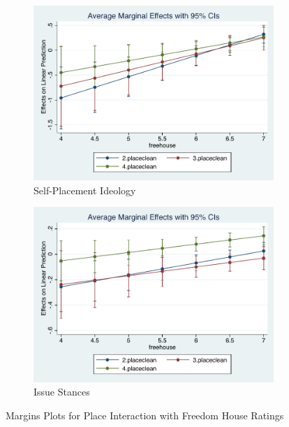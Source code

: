 \documentclass[12pt, titlepage]{article}
\begin{document}
\begin{figure}[H]
	\centering
	\begin{subfigure}[b]{0.475\textwidth}   
		\centering 
		\includegraphics[width=\textwidth]{Margins/IdeoPlaceFree}
		\caption{Self-Placement Ideology}
	\end{subfigure}
	\hfill
	\begin{subfigure}[b]{0.475\textwidth}
		\centering 
		\includegraphics[width=\textwidth]{Margins/LibPlaceFree}
		\caption{Issue Stances}
	\end{subfigure}
	\caption{Margins Plots for Place Interaction with Freedom House Ratings}
	\label{Freedom}
\end{figure}
\end{document}
